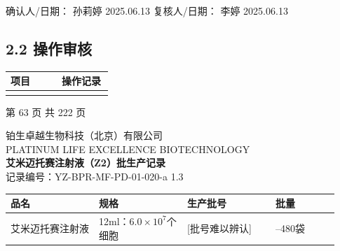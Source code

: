 \documentclass[UTF8,10pt,a4paper,fontset=fandol]{ctexart}
\newcommand{\fieldvalue}[1]{#1}
\newcommand{\handwritten}[1]{#1}
\begin{document}
\noindent
确认人/日期：
\fieldvalue{\handwritten{孙莉婷 2025.06.13}}
\hfill
复核人/日期：
\fieldvalue{\handwritten{李婷 2025.06.13}}

\subsection*{2.2 操作审核}

\begin{center}
\begin{tabular}{|p{0.48\linewidth}|p{0.48\linewidth}|}
\hline
项目 & 操作记录 \\ \hline
& \\[0.45cm] \hline
\end{tabular}
\end{center}

\begin{center}
第 63 页 共 222 页
\end{center}

\newpage

\begin{center}
{\small 铂生卓越生物科技（北京）有限公司}\\
{\small PLATINUM LIFE EXCELLENCE BIOTECHNOLOGY}\\[2pt]
{\Large \textbf{艾米迈托赛注射液（Z2）批生产记录}}\\
记录编号：YZ-BPR-MF-PD-01-020-a
\hspace{2cm}
\fieldvalue{1.3}
\end{center}

\begin{tabular}{|p{0.25\linewidth}|p{0.25\linewidth}|p{0.25\linewidth}|p{0.18\linewidth}|}
\hline
\centering 品名 & \centering 规格 & \centering 生产批号 & \centering 批量\\
\hline
\centering 艾米迈托赛注射液 &
\centering 12ml：$6.0\times10^{7}$个细胞 &
\fieldvalue{\handwritten{[批号难以辨认]}} &
\centering 200--480袋\\
\hline
\end{tabular}

\vspace{2pt}
\end{document}
